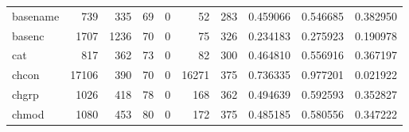 \begin{tabular}{lrrrrrrrrr}
basename  &                                                739 &                                                335 &                                                 69 &                                                  0 &                                                 52 &                                                283 &                                           0.459066 &                               0.546685 &                             0.382950 \\
basenc    &                                               1707 &                                               1236 &                                                 70 &                                                  0 &                                                 75 &                                                326 &                                           0.234183 &                               0.275923 &                             0.190978 \\
cat       &                                                817 &                                                362 &                                                 73 &                                                  0 &                                                 82 &                                                300 &                                           0.464810 &                               0.556916 &                             0.367197 \\
chcon     &                                              17106 &                                                390 &                                                 70 &                                                  0 &                                              16271 &                                                375 &                                           0.736335 &                               0.977201 &                             0.021922 \\
chgrp     &                                               1026 &                                                418 &                                                 78 &                                                  0 &                                                168 &                                                362 &                                           0.494639 &                               0.592593 &                             0.352827 \\
chmod     &                                               1080 &                                                453 &                                                 80 &                                                  0 &                                                172 &                                                375 &                                           0.485185 &                               0.580556 &                             0.347222 \\

\end{tabular}
